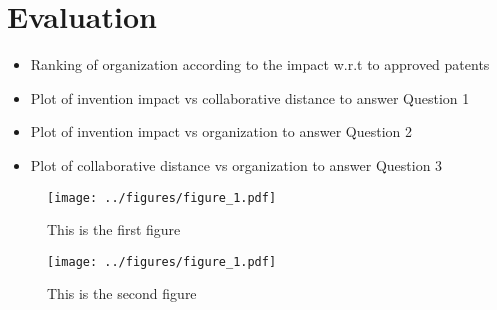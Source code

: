 \section{Evaluation}
	\begin{itemize}
	\squish
		\item Ranking of organization according to the impact w.r.t to approved patents
		\item Plot of invention impact vs collaborative distance to answer Question 1
		\item Plot of invention impact vs organization to answer Question 2
		\item Plot of collaborative distance vs organization to answer Question 3
	\end{itemize}


\begin{minipage}{\linewidth}
  \centering
  \begin{minipage}{0.45\linewidth}
      \begin{figure}[H]
          \texttt{[image: ../figures/figure\_1.pdf]}
          \caption{This is the first figure}
      \end{figure}
  \end{minipage}
  \hspace{0.05\linewidth}
  \begin{minipage}{0.45\linewidth}
      \begin{figure}[H]
          \texttt{[image: ../figures/figure\_1.pdf]}
          \caption{This is the second figure}
      \end{figure}
  \end{minipage}
\end{minipage}


		
